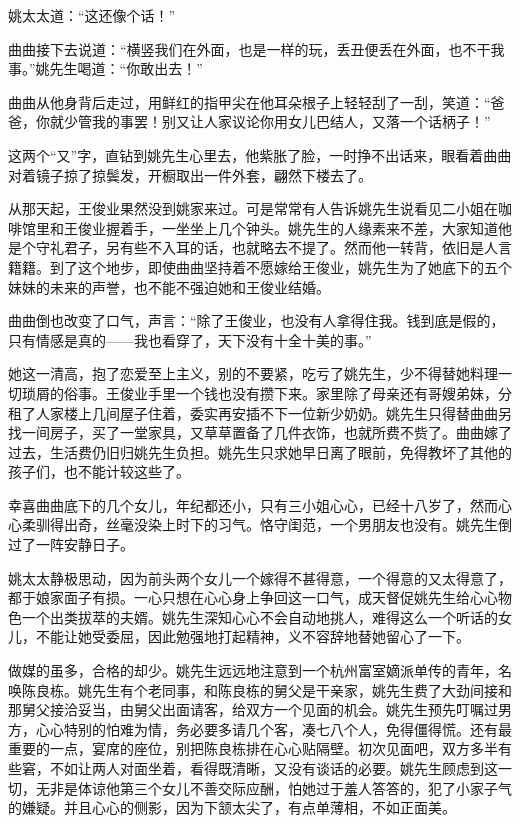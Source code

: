 \par 姚太太道：“这还像个话！”
\par 曲曲接下去说道：“横竖我们在外面，也是一样的玩，丢丑便丢在外面，也不干我事。”姚先生喝道：“你敢出去！”
\par 曲曲从他身背后走过，用鲜红的指甲尖在他耳朵根子上轻轻刮了一刮，笑道：“爸爸，你就少管我的事罢！别又让人家议论你用女儿巴结人，又落一个话柄子！”
\par 这两个“又”字，直钻到姚先生心里去，他紫胀了脸，一时挣不出话来，眼看着曲曲对着镜子掠了掠鬓发，开橱取出一件外套，翩然下楼去了。
\par 从那天起，王俊业果然没到姚家来过。可是常常有人告诉姚先生说看见二小姐在咖啡馆里和王俊业握着手，一坐坐上几个钟头。姚先生的人缘素来不差，大家知道他是个守礼君子，另有些不入耳的话，也就略去不提了。然而他一转背，依旧是人言籍籍。到了这个地步，即使曲曲坚持着不愿嫁给王俊业，姚先生为了她底下的五个妹妹的未来的声誉，也不能不强迫她和王俊业结婚。
\par 曲曲倒也改变了口气，声言：“除了王俊业，也没有人拿得住我。钱到底是假的，只有情感是真的——我也看穿了，天下没有十全十美的事。”
\par 她这一清高，抱了恋爱至上主义，别的不要紧，吃亏了姚先生，少不得替她料理一切琐屑的俗事。王俊业手里一个钱也没有攒下来。家里除了母亲还有哥嫂弟妹，分租了人家楼上几间屋子住着，委实再安插不下一位新少奶奶。姚先生只得替曲曲另找一间房子，买了一堂家具，又草草置备了几件衣饰，也就所费不赀了。曲曲嫁了过去，生活费仍旧归姚先生负担。姚先生只求她早日离了眼前，免得教坏了其他的孩子们，也不能计较这些了。
\par 幸喜曲曲底下的几个女儿，年纪都还小，只有三小姐心心，已经十八岁了，然而心心柔驯得出奇，丝毫没染上时下的习气。恪守闺范，一个男朋友也没有。姚先生倒过了一阵安静日子。
\par 姚太太静极思动，因为前头两个女儿一个嫁得不甚得意，一个得意的又太得意了，都于娘家面子有损。一心只想在心心身上争回这一口气，成天督促姚先生给心心物色一个出类拔萃的夫婿。姚先生深知心心不会自动地挑人，难得这么一个听话的女儿，不能让她受委屈，因此勉强地打起精神，义不容辞地替她留心了一下。
\par 做媒的虽多，合格的却少。姚先生远远地注意到一个杭州富室嫡派单传的青年，名唤陈良栋。姚先生有个老同事，和陈良栋的舅父是干亲家，姚先生费了大劲间接和那舅父接洽妥当，由舅父出面请客，给双方一个见面的机会。姚先生预先叮嘱过男方，心心特别的怕难为情，务必要多请几个客，凑七八个人，免得僵得慌。还有最重要的一点，宴席的座位，别把陈良栋排在心心贴隔壁。初次见面吧，双方多半有些窘，不如让两人对面坐着，看得既清晰，又没有谈话的必要。姚先生顾虑到这一切，无非是体谅他第三个女儿不善交际应酬，怕她过于羞人答答的，犯了小家子气的嫌疑。并且心心的侧影，因为下颔太尖了，有点单薄相，不如正面美。
